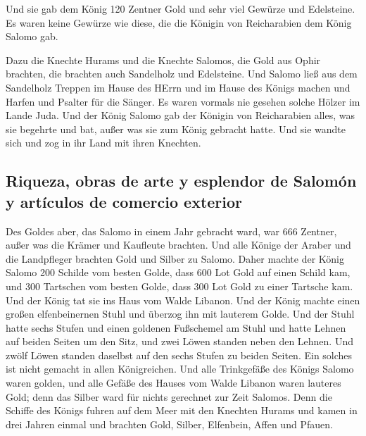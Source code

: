  Und sie gab dem König 120 Zentner Gold und sehr viel
Gewürze und Edelsteine. Es waren keine Gewürze wie diese, die die
Königin von Reicharabien dem König Salomo gab.

 Dazu die Knechte Hurams und die Knechte Salomos, die
Gold aus Ophir brachten, die brachten auch Sandelholz und Edelsteine.
 Und Salomo ließ aus dem Sandelholz Treppen im Hause des
HErrn und im Hause des Königs machen und Harfen und Psalter für die
Sänger. Es waren vormals nie gesehen solche Hölzer im Lande Juda.
 Und der König Salomo gab der Königin von Reicharabien
alles, was sie begehrte und bat, außer was sie zum König gebracht hatte.
Und sie wandte sich und zog in ihr Land mit ihren Knechten.

\hypertarget{riqueza-obras-de-arte-y-esplendor-de-salomuxf3n-y-artuxedculos-de-comercio-exterior}{%
\subsection{Riqueza, obras de arte y esplendor de Salomón y artículos de
comercio
exterior}\label{riqueza-obras-de-arte-y-esplendor-de-salomuxf3n-y-artuxedculos-de-comercio-exterior}}

 Des Goldes aber, das Salomo in einem Jahr gebracht ward,
war 666 Zentner,  außer was die Krämer und Kaufleute
brachten. Und alle Könige der Araber und die Landpfleger brachten Gold
und Silber zu Salomo.  Daher machte der König Salomo 200
Schilde vom besten Golde, dass 600 Lot Gold auf einen Schild kam,
 und 300 Tartschen vom besten Golde, dass 300 Lot Gold zu
einer Tartsche kam.  Und der König tat sie ins Haus vom
Walde Libanon. Und der König machte einen großen elfenbeinernen Stuhl
und überzog ihn mit lauterem Golde.  Und der Stuhl hatte
sechs Stufen und einen goldenen Fußschemel am Stuhl und hatte Lehnen auf
beiden Seiten um den Sitz, und zwei Löwen standen neben den Lehnen.
 Und zwölf Löwen standen daselbst auf den sechs Stufen zu
beiden Seiten. Ein solches ist nicht gemacht in allen Königreichen.
 Und alle Trinkgefäße des Königs Salomo waren golden, und
alle Gefäße des Hauses vom Walde Libanon waren lauteres Gold; denn das
Silber ward für nichts gerechnet zur Zeit Salomos.  Denn
die Schiffe des Königs fuhren auf dem Meer mit den Knechten Hurams und
kamen in drei Jahren einmal und brachten Gold, Silber, Elfenbein, Affen
und Pfauen.

